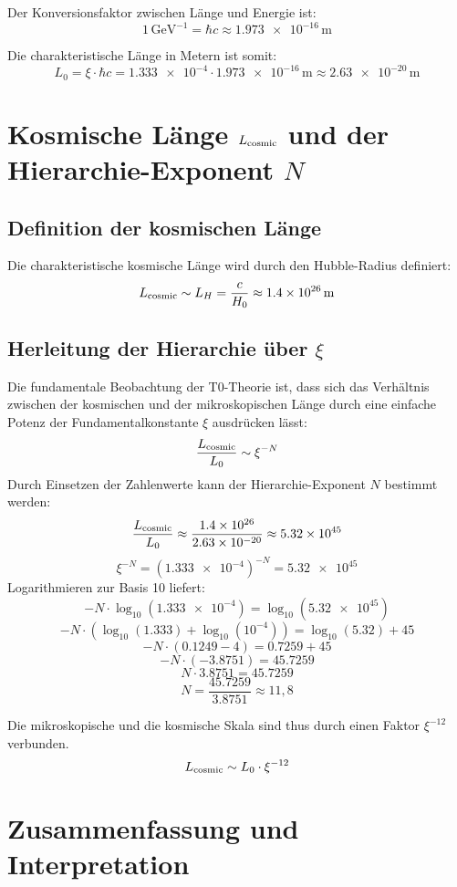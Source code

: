 \documentclass[12pt,a4paper]{article}
\begin{document}
	Der Konversionsfaktor zwischen Länge und Energie ist:
	\[
	1 \, \text{GeV}^{-1} = \hbar c \approx \num{1,973e-16} \, \text{m}
	\]
	
	Die charakteristische Länge in Metern ist somit:
	\[
	L_0 = \xi \cdot \hbar c = \num{1,333e-4} \cdot \num{1,973e-16} \, \text{m} \approx \num{2,63e-20} \, \text{m}
	\]
	
	\section{Kosmische Länge $L_{\rm cosmic}$ und der Hierarchie-Exponent $N$}
	
	\subsection{Definition der kosmischen Länge}
	
	Die charakteristische kosmische Länge wird durch den Hubble-Radius definiert:
	\[
	L_{\rm cosmic} \sim L_H = \frac{c}{H_0} \approx \num{1,4e26} \, \text{m}
	\]
	
	\subsection{Herleitung der Hierarchie über $\xi$}
	
	Die fundamentale Beobachtung der T0-Theorie ist, dass sich das Verhältnis zwischen der kosmischen und der mikroskopischen Länge durch eine einfache Potenz der Fundamentalkonstante $\xi$ ausdrücken lässt:
	\[
	\frac{L_{\rm cosmic}}{L_0} \sim \xi^{-N}
	\]
	Durch Einsetzen der Zahlenwerte kann der Hierarchie-Exponent $N$ bestimmt werden:
	\[
	\frac{L_{\rm cosmic}}{L_0} \approx \frac{\num{1,4e26}}{\num{2,63e-20}} \approx \num{5,32e45}
	\]
	\[
	\xi^{-N} = (\num{1,333e-4})^{-N} = \num{5,32e45}
	\]
	Logarithmieren zur Basis 10 liefert:
	\[
	-N \cdot \log_{10}(\num{1,333e-4}) = \log_{10}(\num{5,32e45})
	\]
	\[
	-N \cdot (\log_{10}(\num{1,333}) + \log_{10}(10^{-4})) = \log_{10}(\num{5,32}) + 45
	\]
	\[
	-N \cdot (\num{0,1249} - 4) = \num{0,7259} + 45
	\]
	\[
	-N \cdot (-\num{3,8751}) = \num{45,7259}
	\]
	\[
	N \cdot \num{3,8751} = \num{45,7259}
	\]
	\[
	N = \frac{\num{45,7259}}{\num{3,8751}} \approx 11,8
	\]
	
	Die mikroskopische und die kosmische Skala sind thus durch einen Faktor $\xi^{-12}$ verbunden.
	\[
	L_{\rm cosmic} \sim L_0 \cdot \xi^{-12}
	\]
	
	\section{Zusammenfassung und Interpretation}
	
\end{document}
